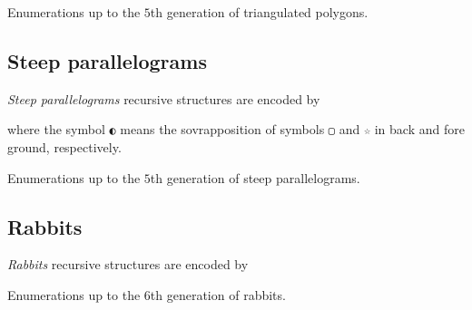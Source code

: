 \begin{margintable}
\caption{Enumerations up to the $5$th generation of triangulated polygons.}
\end{margintable}


\newpage
\subsection{Steep parallelograms}

\textit{Steep parallelograms} recursive structures are encoded by

\begin{margintable}
where the symbol \verb|◐| means the sovrapposition of symbols \verb|▢| and
\verb|☆| in back and fore ground, respectively.
\caption{Enumerations up to the $5$th generation of steep parallelograms.}
\end{margintable}


\subsection{Rabbits}

\textit{Rabbits} recursive structures are encoded by

\begin{margintable}
\caption{Enumerations up to the $6$th generation of rabbits.}
\end{margintable}


